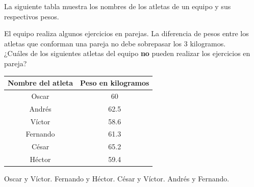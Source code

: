 \documentclass[10pt,letterpaper,addpoints]{exam}
\begin{document}
\begin{questions}
\begin{minipage}{.5\textwidth}
\question 
La siguiente tabla muestra los nombres de los atletas de un equipo y sus respectivos pesos.

El equipo realiza algunos ejercicios en parejas. La diferencia de pesos entre los atletas que conforman una pareja no debe sobrepasar los 3 kilogramos.\\

¿Cuáles de los siguientes atletas del equipo \textbf{no} pueden realizar los ejercicios en pareja?
\end{minipage}\hfill
\begin{minipage}{.5\textwidth}
\begin{tabular}{|c|c|}
\hline 
\textbf{Nombre del atleta} & \textbf{Peso en kilogramos} \\ 
\hline 
Oscar & 60 \\ 
\hline 
Andrés & 62.5 \\ 
\hline 
Víctor & 58.6 \\ 
\hline 
Fernando & 61.3 \\ 
\hline 
César & 65.2 \\ 
\hline 
Héctor & 59.4 \\ 
\hline 
\end{tabular} 
\end{minipage}

\begin{oneparchoices}
\choice Oscar y Víctor.
\choice Fernando y Héctor.
\CorrectChoice César y Víctor.
\choice Andrés y Fernando.
\end{oneparchoices}
\end{questions}
\end{document}
